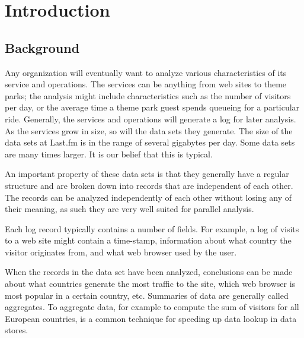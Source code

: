 \pagebreak

\chapter{Introduction}



\section*{Background}


Any organization will eventually want to analyze various characteristics of its
service and operations. The services can be anything from web sites to theme
parks; the analysis might include characteristics such as the number of
visitors per day, or the average time a theme park guest spends queueing for a
particular ride. Generally, the services and operations will generate a log for
later analysis. As the services grow in size, so will the data sets they
generate. The size of the data sets at Last.fm is in the range of several
gigabytes per day. Some data sets are many times larger. It is our belief that
this is typical.

An important property of these data sets is that they generally have a regular
structure and are broken down into records that are independent of each other.
The records can be analyzed independently of each other without losing any of
their meaning, as such they are very well suited for parallel analysis.

Each log record typically contains a number of fields. For example, a log of
visits to a web site might contain a time-stamp, information about what country
the visitor originates from, and what web browser used by the user.

When the records in the data set have been analyzed, conclusions can be made
about what countries generate the most traffic to the site, which web browser
is most popular in a certain country, etc. Summaries of data are generally
called aggregates. To aggregate data, for example to compute the sum of
visitors for all European countries, is a common technique for speeding up data
lookup in data stores.

